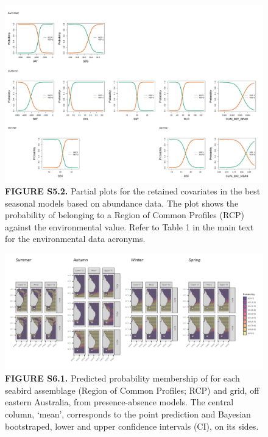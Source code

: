 \documentclass[
]{article}
\begin{document}
\begin{landscape}

\begin{figure}
\centering
\includegraphics{../results/FigS6_2_partial-plots-NegBin.png}
\caption{\textbf{FIGURE S5.2.} Partial plots for the retained covariates
in the best seasonal models based on abundance data. The plot shows the
probability of belonging to a Region of Common Profiles (RCP) against
the environmental value. Refer to Table 1 in the main text for the
environmental data acronyms.}
\end{figure}

\newpage

\begin{figure}
\centering
\includegraphics{../results/FigS5_1_prob-pred-Bernoulli.png}
\caption{\textbf{FIGURE S6.1.} Predicted probability membership of for
each seabird assemblage (Region of Common Profiles; RCP) and grid, off
eastern Australia, from presence-absence models. The central column,
`mean', corresponds to the point prediction and Bayesian bootstraped,
lower and upper confidence intervals (CI), on its sides.}
\end{figure}


\end{landscape}
\end{document}
